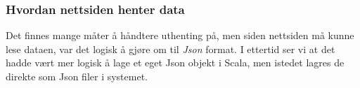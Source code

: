 
\subsubsection{Hvordan nettsiden henter data}
Det finnes mange måter å håndtere uthenting på, men siden nettsiden må kunne lese dataen, var det logisk å gjøre om til \textit{Json} format. I ettertid ser vi at det hadde vært mer logisk å lage et eget Json objekt i Scala, men istedet lagres de direkte som Json filer i systemet.

